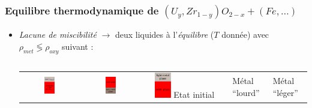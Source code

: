 \subsubsection{Equilibre thermodynamique de $\left(U_y,Zr_{1-y}\right)O_{2-x}+\left(Fe, \dots\right)$}
\begin{frame}
      \baselineskip
      \begin{itemize}
\item \emph{Lacune de miscibilité} $\rightarrow$ deux liquides à l'\emph{équilibre} ($T$ donnée) avec \emph{$\rho_{met}\lessgtr \rho_{oxy}$} suivant :
\begin{columns}[T]
  \begin{column}{0.45\textwidth}
    \begin{tabularx}{\textwidth}{CCC}
    \includegraphics[width=0.2\textwidth]{Figures/schema_stratif_2_ini.eps} & 
    \includegraphics[width=0.2\textwidth]{Figures/schema_stratif_2_hm.eps} &
    \includegraphics[width=0.2\textwidth]{Figures/schema_stratif_2_lm.eps} \n
    \tiny Etat initial & \tiny Métal ``lourd'' & \tiny Métal ``léger''
    \end{tabularx}
  \end{column}

\end{columns}
\end{itemize}
\end{frame}
